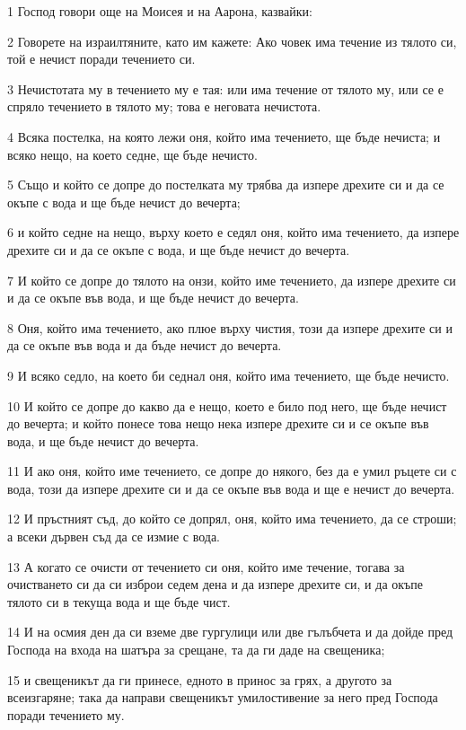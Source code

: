 \par 1 Господ говори още на Моисея и на Аарона, казвайки:
\par 2 Говорете на израилтяните, като им кажете: Ако човек има течение из тялото си, той е нечист поради течението си.
\par 3 Нечистотата му в течението му е тая: или има течение от тялото му, или се е спряло течението в тялото му; това е неговата нечистота.
\par 4 Всяка постелка, на която лежи оня, който има течението, ще бъде нечиста; и всяко нещо, на което седне, ще бъде нечисто.
\par 5 Също и който се допре до постелката му трябва да изпере дрехите си и да се окъпе с вода и ще бъде нечист до вечерта;
\par 6 и който седне на нещо, върху което е седял оня, който има течението, да изпере дрехите си и да се окъпе с вода, и ще бъде нечист до вечерта.
\par 7 И който се допре до тялото на онзи, който име течението, да изпере дрехите си и да се окъпе във вода, и ще бъде нечист до вечерта.
\par 8 Оня, който има течението, ако плюе върху чистия, този да изпере дрехите си и да се окъпе във вода и да бъде нечист до вечерта.
\par 9 И всяко седло, на което би седнал оня, който има течението, ще бъде нечисто.
\par 10 И който се допре до какво да е нещо, което е било под него, ще бъде нечист до вечерта; и който понесе това нещо нека изпере дрехите си и се окъпе във вода, и ще бъде нечист до вечерта.
\par 11 И ако оня, който име течението, се допре до някого, без да е умил ръцете си с вода, този да изпере дрехите си и да се окъпе във вода и ще е нечист до вечерта.
\par 12 И пръстният съд, до който се допрял, оня, който има течението, да се строши; а всеки дървен съд да се измие с вода.
\par 13 А когато се очисти от течението си оня, който име течение, тогава за очистването си да си изброи седем дена и да изпере дрехите си, и да окъпе тялото си в текуща вода и ще бъде чист.
\par 14 И на осмия ден да си вземе две гургулици или две гълъбчета и да дойде пред Господа на входа на шатъра за срещане, та да ги даде на свещеника;
\par 15 и свещеникът да ги принесе, едното в принос за грях, а другото за всеизгаряне; така да направи свещеникът умилостивение за него пред Господа поради течението му.
